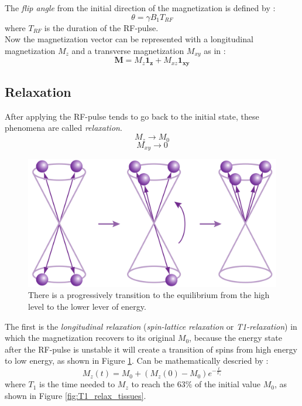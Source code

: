  \noindent The \emph{flip angle} from the initial direction of the magnetization is defined by \cite{slides}:
 \[\theta = \gamma B_{1}T_{RF}\]
 where $T_{RF}$ is the duration of the RF-pulse.\\
 Now the magnetization vector can be represented with a longitudinal magnetization $M_z$ and a transverse magnetization $M_{xy}$ as in \cite{slides}:
 \begin{equation}
    \mathbf{M}=M_{z}\mathbf{1_{z}}+M_{xz}\mathbf{1_{xy}}
 \end{equation}

 \subsection{Relaxation}
 After applying the RF-pulse tends to go back to the initial state, these phenomena are called \emph{relaxation}. 
 \[M_{z} \rightarrow M_{0}\]
 \[M_{xy} \rightarrow 0 \]

 \begin{figure}[h]
   \centering
   \begin{minipage}[c]{0.5\textwidth}
      \includegraphics[width=\textwidth]{images/t1_relax_energy.png}
   \end{minipage}\hfill
   \begin{minipage}[b]{0.45\textwidth}
      \caption{There is a progressively transition to the equilibrium from the high level to the lower lever of energy. \cite{KastlerVetterIRM}}
      \label{fig:T1_relax_energy}
   \end{minipage}
 \end{figure}

 The first is the \emph{longitudinal relaxation} (\emph{spin-lattice relaxation} or \emph{T1-relaxation}) in which the magnetization recovers to its original $M_0$, because the energy state after the RF-pulse is unstable it will create a transition of spins from high energy to low energy, as shown in Figure \ref{fig:T1_relax_energy}. Can be mathematically descried by \cite{slides}:
 \begin{equation}
    M_{z}(t)=M_{0}+(M_{z}(0)-M_{0})e^{-\frac{t}{T_{1}}}
 \end{equation}
 where $T_1$ is the time needed to $M_{z}$ to reach the $63\%$ of the initial value $M_{0}$, as shown in Figure \ref{fig:T1_relax_tissues}.
 
